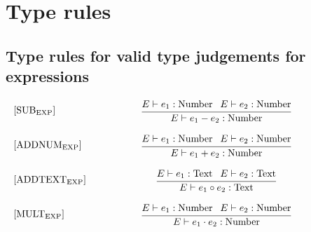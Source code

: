 \chapter{Type rules}\label{typerules:TypeRules}

\section{Type rules for valid type judgements for expressions}\label{app:typerulesforvalid}
\begin{equation}
\begin{minipage}{.2\linewidth}
$[\text{SUB}_\text{EXP}]$
\end{minipage}
\begin{minipage}{.8\linewidth}
\centering
 $\cfrac {E \vdash e_1 : \text{Number } \: \: E \vdash e_2 : \text{Number}}{E \vdash e_1 - e_2 : \text{Number} }$
 \end{minipage}
\end{equation}

\begin{equation}\label{app:eq:addnum}
\begin{minipage}{.2\linewidth}
$[\text{ADDNUM}_\text{EXP}]$ 
\end{minipage}
\begin{minipage}{.8\linewidth}
\centering
$\cfrac{E \vdash e_1 : \text{Number } \: \: E \vdash e_2 : \text{Number}}{E \vdash e_1 + e_2 : \text{Number}}$
\end{minipage}
\end{equation}

\begin{equation}\label{app:eq:addtext}
\begin{minipage}{.2\linewidth}
$[\text{ADDTEXT}_\text{EXP}]$ 
\end{minipage}
\begin{minipage}{.8\linewidth}
\centering
$\cfrac{E \vdash e_1 : \text{Text } \: \: E \vdash e_2 : \text{Text}}{E \vdash e_1 \circ e_2 : \text{Text}}$
\end{minipage}
\end{equation}

\begin{equation}
\begin{minipage}{.2\linewidth}
$[\text{MULT}_\text{EXP}]$
\end{minipage}
\begin{minipage}{.8\linewidth}
\centering
$\cfrac{E \vdash e_1 : \text{Number }\: \: E \vdash e_2 : \text{Number}}{E \vdash e_1 \cdot e_2 : \text{Number}}$
\end{minipage}
\end{equation}

